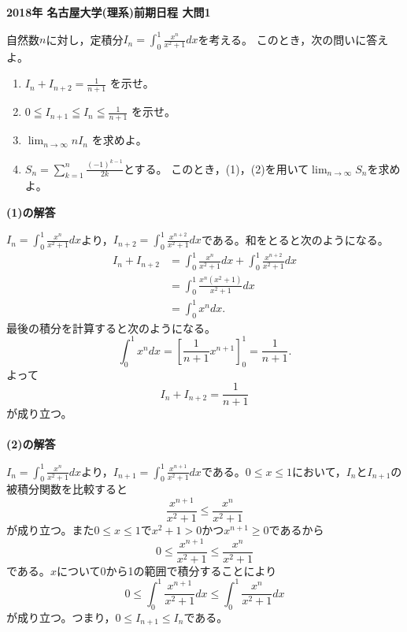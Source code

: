 \documentclass[../main]{subfiles}
\begin{document}
\noindent
{\bf 2018年 名古屋大学(理系)前期日程 大問1}

\vspace{5mm}
自然数$n$に対し，定積分$\displaystyle I_{n}=\int_{0}^{1} \frac{x^{n}}{x^{2}+1} d x$を考える。
このとき，次の問いに答えよ。
\begin{enumerate}[(1)]
 \item $\displaystyle I_{n}+I_{n+2}=\frac{1}{n+1}$ を示せ。
 \item $\displaystyle 0 \leqq I_{n+1} \leqq I_{n} \leqq \frac{1}{n+1}$ を示せ。
 \vspace{2mm}
 \item $\displaystyle \lim _{n \rightarrow \infty} n I_{n}$ を求めよ。
 \item $\displaystyle S_{n}=\sum_{k=1}^{n} \frac{(-1)^{k-1}}{2 k}$とする。
 このとき，(1)，(2)を用いて$\displaystyle \lim _{n \rightarrow \infty} S_{n}$を求めよ。
\end{enumerate}

\vspace{20mm}
\noindent
{\bf (1)の解答}

$\displaystyle I_{n}=\int_{0}^{1} \frac{x^{n}}{x^{2}+1} d x$より，$\displaystyle I_{n+2}=\int_{0}^{1} \frac{x^{n+2}}{x^{2}+1} d x$である。和をとると次のようになる。
\[\begin{aligned}
  I_{n}+I_{n+2} &=\int_{0}^{1} \frac{x^{n}}{x^{2}+1} d x+\int_{0}^{1} \frac{x^{n+2}}{x^{2}+1} d x \\
  &=\int_{0}^{1} \frac{x^{n}\left(x^{2}+1\right)}{x^{2}+1} d x \\
  &=\int_{0}^{1} x^{n} d x.
\end{aligned}\]
最後の積分を計算すると次のようになる。
\[\int_{0}^{1} x^{n} d x=\left[\frac{1}{n+1} x^{n+1}\right]_{0}^{1}=\frac{1}{n+1}.\]
よって
\[I_{n}+I_{n+2}=\frac{1}{n+1}\]
が成り立つ。
\\
\\
{\bf (2)の解答}

$\displaystyle I_{n}=\int_{0}^{1} \frac{x^{n}}{x^{2}+1} d x$より，$\displaystyle I_{n+1}=\int_{0}^{1} \frac{x^{n+1}}{x^{2}+1} d x$である。$0\leq x\leq 1$において，$I_n$と$I_{n+1}$の被積分関数を比較すると
\[\frac{x^{n+1}}{x^{2}+1} \leq \frac{x^{n}}{x^{2}+1}\]
が成り立つ。また$0\leq x\leq 1$で$x^2+1>0$かつ$x^{n+1}\geq 0$であるから
\[0 \leq \frac{x^{n+1}}{x^{2}+1} \leq \frac{x^{n}}{x^{2}+1}\]
である。$x$について0から1の範囲で積分することにより
\[0 \leq \int_{0}^{1} \frac{x^{n+1}}{x^{2}+1} d x \leq \int_{0}^{1} \frac{x^{n}}{x^{2}+1} d x\]
が成り立つ。つまり，$0\leq I_{n+1}\leq I_{n}$である。
\end{document}
